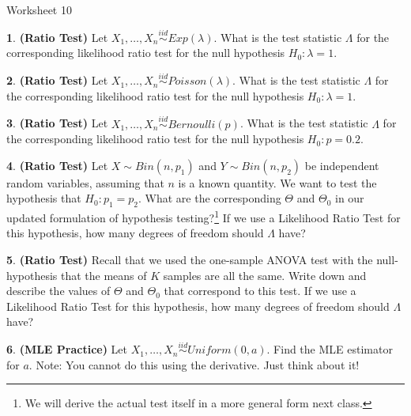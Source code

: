 \documentclass{tufte-handout}
\newcommand{\iid}{\stackrel{iid}{\sim}}
\begin{document}
\justify

{\LARGE Worksheet 10}

\vspace*{18pt}


\textbf{1}. \textbf{(Ratio Test)} Let $X_1, \ldots, X_n \iid Exp(\lambda)$.
What is the test statistic $\Lambda$ for the corresponding likelihood 
ratio test for the null hypothesis $H_0: \lambda = 1$.

\textbf{2}. \textbf{(Ratio Test)} Let $X_1, \ldots, X_n \iid Poisson(\lambda)$.
What is the test statistic $\Lambda$ for the corresponding likelihood 
ratio test for the null hypothesis $H_0: \lambda = 1$.

\textbf{3}. \textbf{(Ratio Test)} Let $X_1, \ldots, X_n \iid Bernoulli(p)$.
What is the test statistic $\Lambda$ for the corresponding likelihood 
ratio test for the null hypothesis $H_0: p = 0.2$.

\textbf{4}. \textbf{(Ratio Test)} Let $X \sim Bin(n, p_1)$ and $Y \sim Bin(n, p_2)$ be
independent random variables, assuming that $n$ is a known quantity. We want
to test the hypothesis that $H_0: p_1 = p_2$. What are the corresponding
$\Theta$ and $\Theta_0$ in
our updated formulation of hypothesis testing?\footnote{
  We will derive the actual test itself in a more general form next
  class.
} If we use a Likelihood Ratio Test for this hypothesis, how many degrees of
freedom should $\Lambda$ have?

\textbf{5}. \textbf{(Ratio Test)} Recall that we used the one-sample ANOVA test with the
null-hypothesis that the means of $K$ samples are all the same. Write down and
describe the values of $\Theta$ and $\Theta_0$ that correspond to this test. 
If we use a Likelihood Ratio Test for this hypothesis, how many degrees of
freedom should $\Lambda$ have?

\textbf{6}. \textbf{(MLE Practice)} Let $X_1, \ldots, X_n \iid Uniform(0, a)$. Find the MLE
estimator for $a$. Note: You cannot do this using the derivative. Just think about it!
\end{document}
